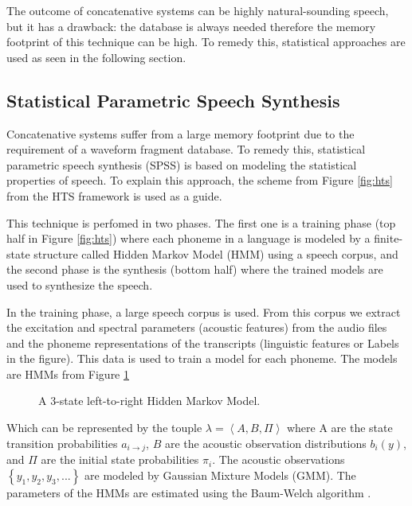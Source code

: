 The outcome of concatenative systems can be highly natural-sounding speech, but it has a drawback: the database is always needed therefore the memory footprint of this technique can be high. To remedy this, statistical approaches are used as seen in the following section.

\subsection{Statistical Parametric Speech Synthesis}

Concatenative systems suffer from a large memory footprint due to the requirement of a waveform fragment database. To remedy this, statistical parametric speech synthesis (SPSS) is based on modeling the statistical properties of speech. To explain this approach, the scheme from Figure \ref{fig:hts} from the HTS framework \cite{zen2007hmm} is used as a guide.

This technique is perfomed in two phases. The first one is a training phase (top half in Figure \ref{fig:hts}) where each phoneme in a language is modeled by a finite-state structure called Hidden Markov Model (HMM) using a speech corpus, and the second phase is the synthesis (bottom half) where the trained models are used to synthesize the speech.

In the training phase, a large speech corpus is used. From this corpus we extract the excitation and spectral parameters (acoustic features) from the audio files and the phoneme representations of the transcripts (linguistic features or Labels in the figure). This data is used to train a model for each phoneme. The models are HMMs from Figure \ref{fig:hmm}

\begin{figure}[h]
    \centering

    

    \caption{A 3-state left-to-right Hidden Markov Model.}
    \label{fig:hmm}
\end{figure}

Which can be represented by the touple $\lambda = \left < A, B, \Pi  \right >$ where A are the state transition probabilities $a_{i \rightarrow j}$, $B$ are the acoustic observation distributions $b_i(y)$, and $\Pi$ are the initial state probabilities $\pi_i$. The acoustic observations $\left \{ y_1, y_2, y_3, ... \right  \}$ are modeled by Gaussian Mixture Models (GMM). The parameters of the HMMs are estimated using the Baum-Welch algorithm \cite{blunsom2004hidden}.

